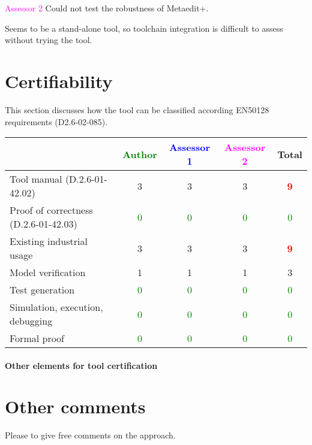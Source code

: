 \textcolor{magenta}{Assessor 2} Could not test the robustness of Metaedit+.

Seems to be a stand-alone tool, so toolchain integration is difficult to assess
without trying the tool.

\section{Certifiability}

This section discusses how the tool can be classified according EN50128 requirements (D2.6-02-085).


\begin{tabular}{|l | c | c | c | c|}
\hline
& \textcolor{green}{Author} & \textcolor{blue}{Assessor 1} & \textcolor{magenta}{Assessor 2} & Total \\
\hline 
Tool manual (D.2.6-01-42.02) &3 &3 & 3    & \textcolor{red}{\textbf{9}} \\
\hline
Proof of correctness (D.2.6-01-42.03)   & \textcolor{green}{0}   & \textcolor{green}{0}   & \textcolor{green}{0} & \textcolor{green}{0} \\
\hline
Existing industrial  usage  &3 &3 & 3    & \textcolor{red}{\textbf{9}} \\
\hline
Model verification &1 &1 & 1    & 3     \\
\hline
Test generation & \textcolor{green}{0}   & \textcolor{green}{0}   & \textcolor{green}{0} & \textcolor{green}{0} \\
\hline
Simulation, execution, debugging & \textcolor{green}{0}   & \textcolor{green}{0}   & \textcolor{green}{0} & \textcolor{green}{0} \\
\hline
Formal proof & \textcolor{green}{0}   & \textcolor{green}{0}   & \textcolor{green}{0} & \textcolor{green}{0} \\
\hline
\end{tabular}

\paragraph{Other elements for tool certification}

\section{Other comments}
Please to  give free comments on the approach.




